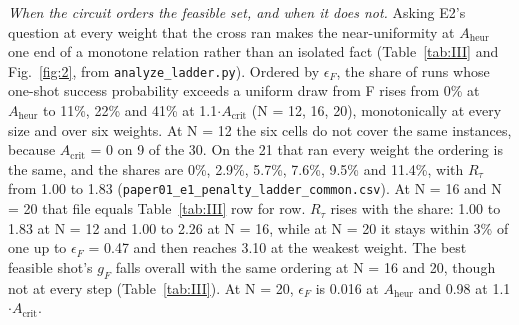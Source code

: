 \documentclass[journal]{IEEEtran}
\begin{document}
\begin{table}[!t]
\end{table}


\textit{When the circuit orders the feasible set, and when it does not.} Asking E2's question at every weight that the cross ran makes the near-uniformity at $A_{\mathrm{heur}}$ one end of a monotone relation rather than an isolated fact (Table~\ref{tab:III} and Fig.~\ref{fig:2}, from \texttt{analyze\_ladder.py}). Ordered by $\epsilon_{F}$, the share of runs whose one-shot success probability exceeds a uniform draw from F rises from 0\% at $A_{\mathrm{heur}}$ to 11\%, 22\% and 41\% at 1.1$\cdot$$A_{\mathrm{crit}}$ (N = 12, 16, 20), monotonically at every size and over six weights. At N = 12 the six cells do not cover the same instances, because $A_{\mathrm{crit}}$ = 0 on 9 of the 30. On the 21 that ran every weight the ordering is the same, and the shares are 0\%, 2.9\%, 5.7\%, 7.6\%, 9.5\% and 11.4\%, with $R_{\tau}$ from 1.00 to 1.83 (\texttt{paper01\_e1\_penalty\_ladder\_common.csv}). At N = 16 and N = 20 that file equals Table~\ref{tab:III} row for row. $R_{\tau}$ rises with the share: 1.00 to 1.83 at N = 12 and 1.00 to 2.26 at N = 16, while at N = 20 it stays within 3\% of one up to $\epsilon_{F}$ = 0.47 and then reaches 3.10 at the weakest weight. The best feasible shot's $g_{F}$ falls overall with the same ordering at N = 16 and 20, though not at every step (Table~\ref{tab:III}). At N = 20, $\epsilon_{F}$ is 0.016 at $A_{\mathrm{heur}}$ and 0.98 at 1.1$\cdot$$A_{\mathrm{crit}}$.
\end{document}
